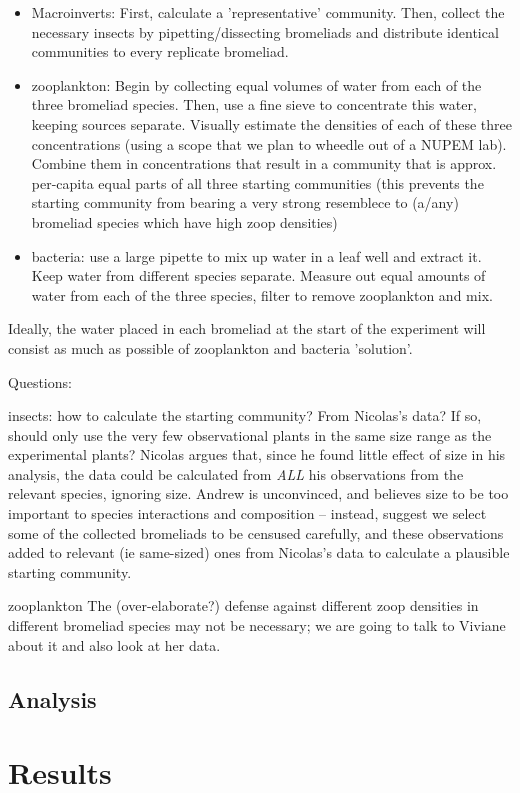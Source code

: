 \documentclass[10pt]{article}
\begin{document}
\begin{spacing}{2}
\begin{itemize}
\item Macroinverts: First, calculate a 'representative'
community. Then, collect the necessary insects by pipetting/dissecting
bromeliads and distribute identical communities to every replicate
bromeliad.
\item zooplankton: Begin by collecting equal volumes of water from
  each of the three bromeliad species.  Then, use a fine sieve to
  concentrate this water, keeping sources separate. Visually estimate
  the densities of each of these three concentrations (using a scope
  that we plan to wheedle out of a NUPEM lab).  Combine them in
  concentrations that result in a community that is approx. per-capita
  equal parts of all three starting communities (this prevents the
  starting community from bearing a very strong resemblece to (a/any)
  bromeliad species which have high zoop densities)
\item bacteria: use a large pipette to mix up water in a leaf well and
  extract it.  Keep water from different species separate.  Measure
  out equal amounts of water from each of the three species, filter to
  remove zooplankton and mix.
\end{itemize}

Ideally, the water placed in each bromeliad at the start of the
experiment will consist as much as possible of zooplankton and
bacteria 'solution'.

Questions:

insects: how to calculate the starting community?  From Nicolas's
data?  If so, should only use the very few observational plants in the
same size range as the experimental plants?  Nicolas argues that,
since he found little effect of size in his analysis, the data could
be calculated from \emph{ALL} his observations from the relevant
species, ignoring size.  Andrew is unconvinced, and believes size to
be too important to species interactions and composition -- instead,
suggest we select some of the collected bromeliads to be censused
carefully, and these observations added to relevant (ie same-sized)
ones from Nicolas's data to calculate a plausible starting community.

zooplankton
The (over-elaborate?) defense against different zoop densities in
different bromeliad species may not be necessary; we are going to talk
to Viviane about it and also look at her data.





\subsection{Analysis}

\section{Results}

\end{spacing}

 

\end{document}
